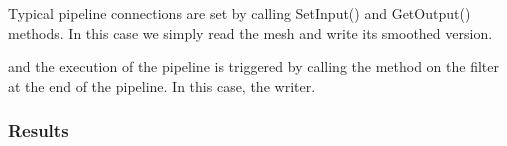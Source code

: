 \documentclass{InsightArticle}
\begin{document}
\begin{center}

\end{center}

Typical pipeline connections are set by calling SetInput() and GetOutput() methods.
In this case we simply read the mesh and write its smoothed version.

\begin{center}

\end{center}

and the execution of the pipeline is triggered by calling the  method 
on the filter at the end of the pipeline. In this case, the writer.

\begin{center}

\end{center}


\subsubsection{Results}



%
%



\end{document}
